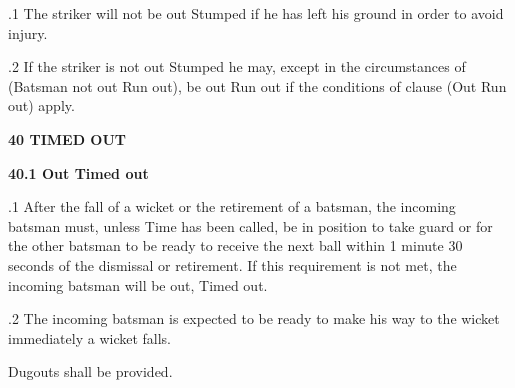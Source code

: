 \documentclass[12pt]{article}
\begin{document}
\vspace{\baselineskip}
{\fontsize{9pt}{10.8pt}.1 \tabto{0.49in} The striker will not be out Stumped if he has left his ground in order to avoid injury.\par}\par


\vspace{\baselineskip}
\begin{adjustwidth}{0.5in}{0.01in}
{\fontsize{9pt}{10.8pt}.2 \tabto{0.49in} If the striker is not out Stumped he may, except in the circumstances of (Batsman not out Run out), be out Run out if the conditions of clause (Out Run out) apply.\par}\par

\end{adjustwidth}


\vspace{\baselineskip}
{\fontsize{16pt}{19.2pt}\selectfont \textbf{40 TIMED OUT}\par}\par


\vspace{\baselineskip}
{\fontsize{11pt}{13.2pt}\selectfont \textbf{40.1 \tabto{0.47in} Out Timed out}\par}\par


\vspace{\baselineskip}
\begin{adjustwidth}{0.5in}{0.11in}
{\fontsize{9pt}{10.8pt}.1 \tabto{0.49in} After the fall of a wicket or the retirement of a batsman, the incoming batsman must, unless Time has been called, be in position to take guard or for the other batsman to be ready to receive the next ball within 1 minute 30 seconds of the dismissal or retirement. If this requirement is not met, the incoming batsman will be out, Timed out.\par}\par

\end{adjustwidth}


\vspace{\baselineskip}
{\fontsize{9pt}{10.8pt}.2 \tabto{0.49in} The incoming batsman is expected to be ready to make his way to the wicket immediately a wicket falls.\par}\par


\vspace{\baselineskip}
\begin{adjustwidth}{0.5in}{0.0in}
{\fontsize{9pt}{10.8pt}\selectfont Dugouts shall be provided.\par}\par

\end{adjustwidth}
\end{document}
